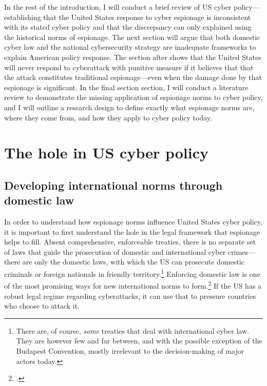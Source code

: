 \documentclass{memoir}
\begin{document}
\begin{refsegment}
In the rest of the introduction, I will conduct a brief review of US cyber policy---establishing that the United States response to cyber espionage is inconsistent with its stated cyber policy and that the discrepancy can only explained using the historical norms of espionage. The next section will argue that both domestic cyber law and the national cybersecurity strategy are inadequate frameworks to explain American policy response. The section after shows that the United States will never respond to cyberattack with punitive measure if it believes that that the attack constitutes traditional espionage---even when the damage done by that espionage is significant. In the final section section, I will conduct a literature review to demonstrate the missing application of espionage norms to cyber policy, and I will outline a research design to define exactly what espionage norms are, where they come from, and how they apply to cyber policy today.

\section{The hole in US cyber policy}
\subsection{Developing international norms through domestic law}
In order to understand how espionage norms influence United States cyber policy, it is important to first understand the hole in the legal framework that espionage helps to fill. Absent comprehensive, enforceable treaties, there is no separate set of laws that guide the prosecution of domestic and international cyber crimes---there are only the domestic laws, with which the US can prosecute domestic criminals or foreign nationals in friendly territory.\footnote{There are, of course, \emph{some} treaties that deal with international cyber law. They are however few and far between, and with the possible exception of the Budapest Convention, mostly irrelevant to the decision-making of major actors today.} Enforcing domestic law is one of the most promising ways for new international norms to form.\footcite[p.~295]{deeks_international_2015} If the US has a robust legal regime regarding cyberattacks, it can use that to pressure countries who choose to attack it.


\end{refsegment}
\end{document}
